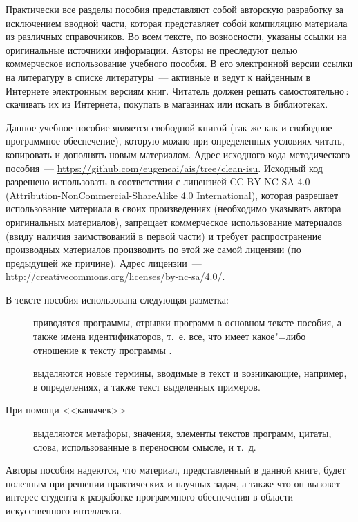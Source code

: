 \documentclass[a4paper,14pt, openany, twoside, draft]{extbook} %
\begin{document}
Практически все разделы пособия представляют собой авторскую разработку за исключением вводной части, которая представляет собой компиляцию материала из различных справочников.  Во всем тексте, по возносности, указаны ссылки на оригинальные источники информации.  Авторы не преследуют целью коммерческое использование учебного пособия.  В его электронной версии ссылки на литературу в списке литературы~--- активные и ведут к найденным в Интернете электронным версиям книг.  Читатель должен решать самостоятельно\,: скачивать их из Интернета, покупать в магазинах или искать в библиотеках.

Данное учебное пособие является свободной книгой (так же как и свободное программное обеспечение), которую можно при определенных условиях читать, копировать и дополнять новым материалом. Адрес исходного кода методического пособия~--- \url{https://github.com/eugeneai/ais/tree/clean-isu}. Исходный код разрешено использовать в соответствии с лицензией \foreignlanguage{english}{CC BY-NC-SA 4.0 (Attribution-NonCommercial-ShareAlike 4.0 International)}, которая разрешает использование материала в своих произведениях (необходимо указывать автора оригинальных материалов), запрещает коммерческое использование материалов (ввиду наличия заимствований в первой части) и требует распространение производных материалов производить по этой же самой лицензии (по предыдущей же причине). Адрес лицензии~--- \url{http://creativecommons.org/licenses/by-nc-sa/4.0/}.

В тексте пособия использована следующая разметка:
\begin{description}
\item[] приводятся программы, отрывки программ в основном тексте пособия, а также имена идентификаторов, т.~е. все, что имеет какое"=либо отношение к тексту программы .
\item[] выделяются новые термины, вводимые в текст и возникающие, например, в определениях, а также текст выделенных примеров.
\item[\normalfont При помощи <<кавычек>>] выделяются метафоры, значения, элементы текстов программ, цитаты, слова, использованные в переносном смысле, и т.~д.
\end{description}

Авторы пособия надеются, что материал, представленный в данной книге, будет полезным при решении практических и научных задач, а также что он вызовет интерес студента к разработке программного обеспечения в области искусственного интеллекта.
\end{document}
